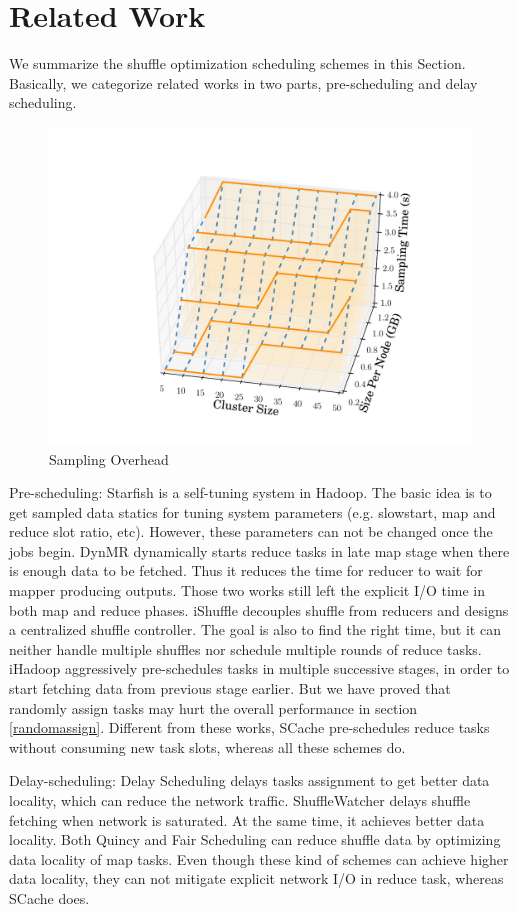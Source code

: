 \section{Related Work}
We summarize the shuffle optimization scheduling schemes in this Section. Basically, we categorize related works in two parts, pre-scheduling and delay scheduling.
\begin{figure}
	\centering
	\includegraphics[width=0.8\linewidth]{fig/sampling}
	\caption{Sampling Overhead}
	\label{fig:sampling}
\end{figure}
Pre-scheduling: Starfish \cite{starfish} is a self-tuning system in Hadoop. The basic idea is to get sampled data statics for tuning system parameters (e.g. slowstart, map and reduce slot ratio, etc). However, these parameters can not be changed once the jobs begin. DynMR \cite{dynmr} dynamically starts reduce tasks in late map stage when there is enough data to be fetched. Thus it reduces the time for reducer to wait for mapper producing outputs. Those two works still left the explicit I/O time in both map and reduce phases. iShuffle \cite{ishuffle} decouples shuffle from reducers and designs a centralized shuffle controller. The goal is also to find the right time, but it can neither handle multiple shuffles nor schedule multiple rounds of reduce tasks. iHadoop \cite{ihadoop} aggressively pre-schedules tasks in multiple successive stages, in order to start fetching data from previous stage earlier. But we have proved that randomly assign tasks may hurt the overall performance in section \ref{randomassign}. Different from these works, SCache pre-schedules reduce tasks without consuming new task slots, whereas all these schemes do.

Delay-scheduling: Delay Scheduling \cite{delay} delays tasks assignment to get better data locality, which can reduce the network traffic. ShuffleWatcher \cite{shufflewatcher} delays shuffle fetching when network is saturated. At the same time, it achieves better data locality. Both Quincy \cite{quincy} and Fair Scheduling \cite{preemptive} can reduce shuffle data by optimizing data locality of map tasks. Even though these kind of schemes can achieve higher data locality, they can not mitigate explicit network I/O in reduce task, whereas SCache does. 